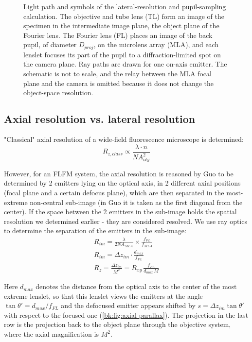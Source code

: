 \begin{figure}[tbp]
    \centering
    \resizebox{\textwidth}{!}{}
    \caption{Light path and symbols of the lateral-resolution and pupil-sampling calculation. The objective and tube lens (TL) form an image of the specimen in the intermediate image plane, the object plane of the Fourier lens. The Fourier lens (FL) places an image of the back pupil, of diameter $D_{proj}$, on the microlens array (MLA), and each lenslet focuses its part of the pupil to a diffraction-limited spot on the camera plane. Ray paths are drawn for one on-axis emitter. The schematic is not to scale, and the relay between the MLA focal plane and the camera is omitted because it does not change the object-space resolution.}
    \label{bk:fig:flfm-path}
\end{figure}

\subsection{Axial resolution vs. lateral resolution}
\label{bk:subsec:axial-resolution-vs-lateral-resolution}
"Classical" axial resolution of a wide-field fluorescence microscope is determined:
\begin{equation}
    R_{z,class} \propto \frac{\lambda \cdot n}{NA_{obj}^2}
\end{equation}

However, for an FLFM system, the axial resolution is reasoned by Guo to be determined by 2 emitters lying on the optical axis, in 2 different axial positions (focal plane and a certain defocus plane), which are then separated in the most-extreme non-central sub-image (in Guo it is taken as the first diagonal from the center). If the space between the 2 emitters in the sub-image holds the spatial resolution we determined earlier - they are considered resolved. We use ray optics to determine the separation of the emitters in the sub-image:
\begin{gather}
    R_{im} = \frac{\lambda}{2NA_{MLA}}\times\frac{f_{FL}}{f_{MLA}} \\
    R_{im} = \Delta z_{im}\cdot\frac{d_{max}}{f_{FL}} \\
    R_z = \frac{\Delta z_{im}}{M^2} = R_{xy}\,\frac{f_{FL}}{d_{max}\,M}
\end{gather}

Here $d_{max}$ denotes the distance from the optical axis to the center of the most extreme lenslet, so that this lenslet views the emitters at the angle $\tan\theta' = d_{max}/f_{FL}$ and the defocused emitter appears shifted by $s=\Delta z_{im}\tan\theta'$ with respect to the focused one (\cref{bk:fig:axial-parallax}). The projection in the last row is the projection back to the object plane through the objective system, where the axial magnification is $M^2$.

